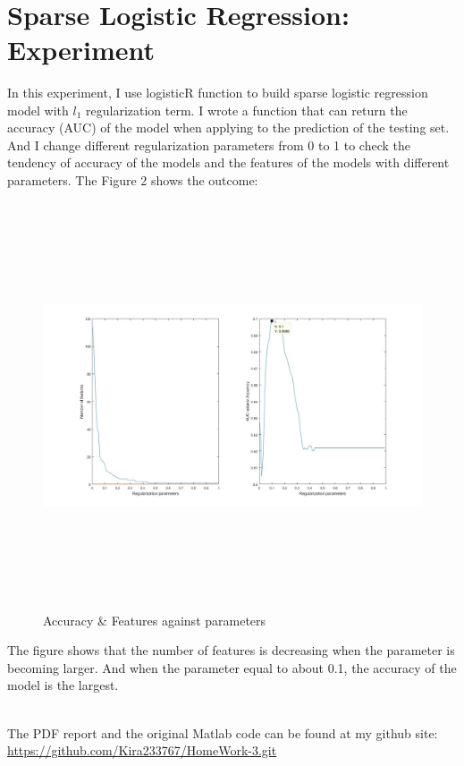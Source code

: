 \documentclass[letterpaper,12pt]{article}
\begin{document}
\quad \\

\section{Sparse Logistic Regression: Experiment}
In this experiment, I use logisticR function to build sparse logistic regression model with $l_1$ regularization term. I wrote a function that can return the accuracy (AUC) of the model when applying to the prediction of the testing set. And I change different regularization parameters from 0 to 1 to check the tendency of accuracy of the models and the features of the models with different parameters. The Figure 2 shows the outcome:
\begin{center}
\begin{figure}[H]
\includegraphics[width = 17cm, height = 12cm]{"Figure2.jpg"}
\caption{Accuracy \& Features against parameters}
\end{figure}
\end{center}
The figure shows that the number of features is decreasing when the parameter is becoming larger. And when the parameter equal to about 0.1, the accuracy of the model is the largest.


\quad
\\



The PDF report and the original Matlab code can be found at my github site:   
\url{https://github.com/Kira233767/HomeWork-3.git}
\end{document}

